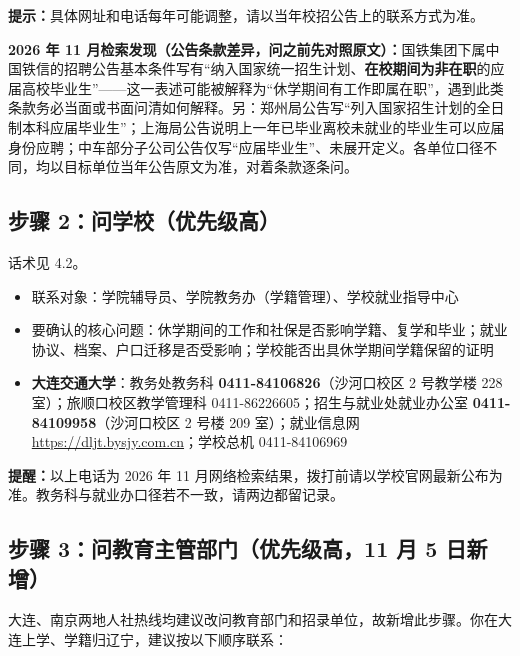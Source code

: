 \documentclass[UTF8,fontset=fandol,zihao=-4]{ctexart}
\begin{document}
\begin{notebox}
\small \textbf{提示：}具体网址和电话每年可能调整，请以当年校招公告上的联系方式为准。
\end{notebox}

\begin{notebox}
\small \textbf{2026 年 11 月检索发现（公告条款差异，问之前先对照原文）：}国铁集团下属中国铁信的招聘公告基本条件写有“纳入国家统一招生计划、\textbf{在校期间为非在职}的应届高校毕业生”——这一表述可能被解释为“休学期间有工作即属在职”，遇到此类条款务必当面或书面问清如何解释。另：郑州局公告写“列入国家招生计划的全日制本科应届毕业生”；上海局公告说明上一年已毕业离校未就业的毕业生可以应届身份应聘；中车部分子公司公告仅写“应届毕业生”、未展开定义。各单位口径不同，均以目标单位当年公告原文为准，对着条款逐条问。
\end{notebox}

\subsection{步骤 2：问学校（优先级高）}

话术见 4.2。

\begin{itemize}
  \item 联系对象：学院辅导员、学院教务办（学籍管理）、学校就业指导中心
  \item 要确认的核心问题：休学期间的工作和社保是否影响学籍、复学和毕业；就业协议、档案、户口迁移是否受影响；学校能否出具休学期间学籍保留的证明
  \item \textbf{大连交通大学}：教务处教务科 \textbf{0411-84106826}（沙河口校区 2 号教学楼 228 室）；旅顺口校区教学管理科 0411-86226605；招生与就业处就业办公室 \textbf{0411-84109958}（沙河口校区 2 号楼 209 室）；就业信息网 \url{https://dljt.bysjy.com.cn}；学校总机 0411-84106969
\end{itemize}

\begin{notebox}
\small \textbf{提醒：}以上电话为 2026 年 11 月网络检索结果，拨打前请以学校官网最新公布为准。教务科与就业办口径若不一致，请两边都留记录。
\end{notebox}

\subsection{步骤 3：问教育主管部门（优先级高，11 月 5 日新增）}

大连、南京两地人社热线均建议改问教育部门和招录单位，故新增此步骤。你在大连上学、学籍归辽宁，建议按以下顺序联系：
\end{document}
